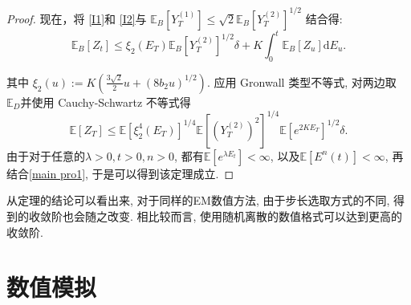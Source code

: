 \begin{proof}
	现在，将 \cref{I1}和 \cref{I2}与  $\mathbb{E}_B[Y_T^{(1)}]\leq\sqrt{2}\mathbb{E}_B[Y_T^{(2)}]^{1/2}$ 结合得:
	\begin{equation*}
			\mathbb{E}_B[Z_t] 
		\leq \xi_2(E_T)\mathbb{E}_B[Y_T^{(2)}]^{1/2}\delta + K\int_0^t\mathbb{E}_B[Z_u] \mathrm{d}E_u.
	\end{equation*}

	其中 $\xi_2(u) := K(\frac{3\sqrt{2}}{2}u + (8b_2u)^{1/2}).$
	应用 Gronwall 类型不等式, 对两边取 $ \mathbb{E}_D $并使用 Cauchy-Schwartz 不等式得 
	\begin{equation*}
			\mathbb{E}[Z_T] \leq \mathbb{E}[\xi_2^4(E_T)]^{1/4}\mathbb{E}[(Y_T^{(2)})^2]^{1/4}\mathbb{E}[e^{2KE_T}]^{1/2}\delta.
	\end{equation*}
	由于对于任意的$\lambda>0, t>0,n>0$, 都有$\mathbb{E}[e^{\lambda E_t}] < \infty$, 以及$\mathbb{E}[E^n(t)] < \infty$, 再结合\cref{main pro1}, 于是可以得到该定理成立.
\end{proof}

	\begin{remark}
		从定理的结论可以看出来, 对于同样的EM数值方法, 由于步长选取方式的不同, 得到的收敛阶也会随之改变.  相比较而言, 使用随机离散的数值格式可以达到更高的收敛阶.
	\end{remark}

	\section{数值模拟}
	
	
